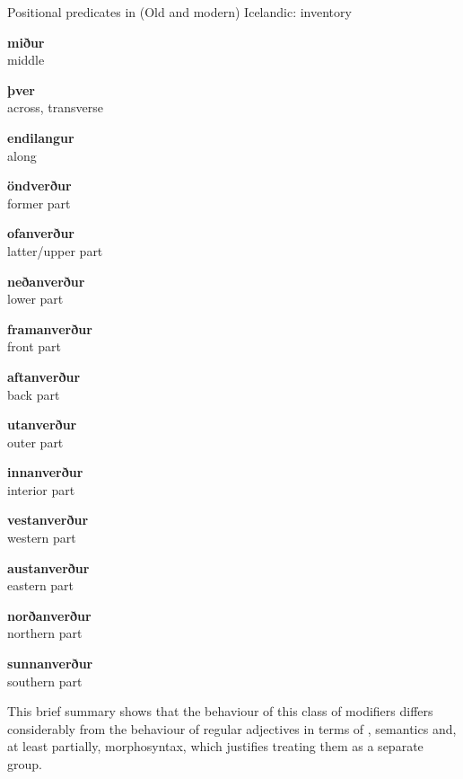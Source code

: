 \documentclass[output=paper,colorlinks,citecolor=brown]{langscibook}
\begin{document}
{\small
\begin{exe}
  \ex \label{ICE1} Positional predicates in (Old and modern) Icelandic: inventory
\begin{multicols}{3}{
     \begin{xlist}
	\ex     \textbf{miður}     \\    {middle} 

	\ex     \textbf{þver}     \\    {across, transverse} 

	\ex     \textbf{endilangur}     \\    {along} 

	\ex     \textbf{öndverður}     \\    {former part} 

	\ex     \textbf{ofanverður}     \\    {latter/upper part} 

	\ex     \textbf{neðanverður}     \\    {lower part} 

	\ex     \textbf{framanverður}     \\    {front part} 

	\ex     \textbf{aftanverður}     \\    {back part} 

	\ex     \textbf{utanverður}     \\    {outer part} 

	\ex     \textbf{innanverður}     \\    {interior part}  

	\ex     \textbf{vestanverður}     \\    {western part} 

	\ex     \textbf{austanverður}     \\    {eastern part} 

	\ex     \textbf{norðanverður}     \\    {northern part} 

	\ex     \textbf{sunnanverður}     \\    {southern part}  \\ 

     \end{xlist}  }
\end{multicols}  
\end{exe} }


This brief summary shows that the behaviour of this class of modifiers differs considerably from the behaviour of regular adjectives in terms of , semantics and, at least partially, morphosyntax, which justifies treating them as a separate group. 
\end{document}
